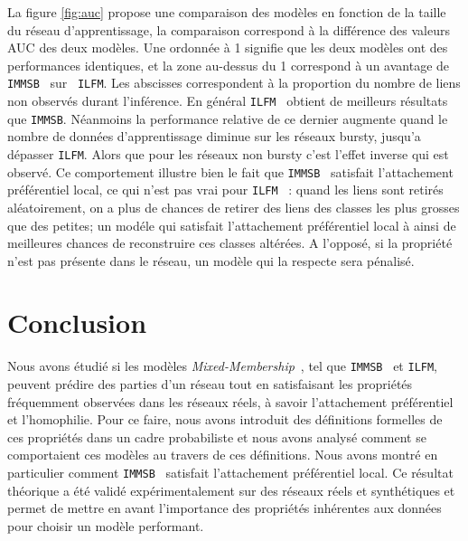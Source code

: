 \documentclass[french]{hermes-journal}
\newcommand{\ilfm}{\texttt{ILFM}}
\newcommand{\immsb}{\texttt{IMMSB}}
\newcommand{\mmm}{\textit{Mixed-Membership}~}
\begin{document}
La figure \ref{fig:auc} propose une comparaison des modèles en fonction de la taille du réseau d'apprentissage, la comparaison correspond à la différence des valeurs AUC des deux modèles. Une ordonnée à 1 signifie que les deux modèles ont des performances identiques, et la zone au-dessus du 1 correspond à un avantage de \immsb~ sur ~\ilfm. Les abscisses correspondent à la proportion du nombre de liens non observés durant l'inférence. En général \ilfm~ obtient de meilleurs résultats que \immsb. Néanmoins la performance relative de ce dernier augmente quand le nombre de données d'apprentissage diminue sur les réseaux bursty, jusqu'a dépasser \ilfm. Alors que pour les réseaux non bursty c'est l'effet inverse qui est observé. Ce comportement illustre bien le fait que \immsb~ satisfait l'attachement préférentiel local, ce qui n'est pas vrai pour  \ilfm~ : quand les liens sont retirés aléatoirement, on a plus de chances de retirer des liens des classes les plus grosses que des petites; un modéle qui satisfait l'attachement préférentiel local à ainsi de meilleures chances de reconstruire ces classes altérées. A l'opposé, si la propriété n'est pas présente dans le réseau, un modèle qui la respecte sera pénalisé.

\section{Conclusion}

Nous avons étudié si les modèles \mmm, tel que \immsb~ et \ilfm, peuvent prédire des parties d'un réseau tout en satisfaisant les propriétés fréquemment observées dans les réseaux réels, à savoir l'attachement préférentiel et l'homophilie. Pour ce faire, nous avons introduit des définitions formelles de ces propriétés dans un cadre probabiliste et nous avons analysé comment se comportaient ces modèles au travers de ces définitions. Nous avons montré en particulier comment \immsb~ satisfait l'attachement préférentiel local. Ce résultat théorique a été validé expérimentalement sur des réseaux réels et synthétiques et permet de mettre en avant l'importance des propriétés inhérentes aux données pour choisir un modèle performant.












%

\end{document}
